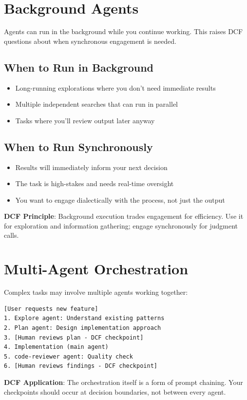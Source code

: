 \section{Background Agents}

Agents can run in the background while you continue working. This raises DCF questions about when synchronous engagement is needed.

\subsection{When to Run in Background}

\begin{itemize}
    \item Long-running explorations where you don't need immediate results
    \item Multiple independent searches that can run in parallel
    \item Tasks where you'll review output later anyway
\end{itemize}

\subsection{When to Run Synchronously}

\begin{itemize}
    \item Results will immediately inform your next decision
    \item The task is high-stakes and needs real-time oversight
    \item You want to engage dialectically with the process, not just the output
\end{itemize}

\textbf{DCF Principle}: Background execution trades engagement for efficiency. Use it for exploration and information gathering; engage synchronously for judgment calls.

\section{Multi-Agent Orchestration}

Complex tasks may involve multiple agents working together:

\begin{lstlisting}
[User requests new feature]
1. Explore agent: Understand existing patterns
2. Plan agent: Design implementation approach
3. [Human reviews plan - DCF checkpoint]
4. Implementation (main agent)
5. code-reviewer agent: Quality check
6. [Human reviews findings - DCF checkpoint]
\end{lstlisting}

\textbf{DCF Application}: The orchestration itself is a form of prompt chaining. Your checkpoints should occur at decision boundaries, not between every agent.

